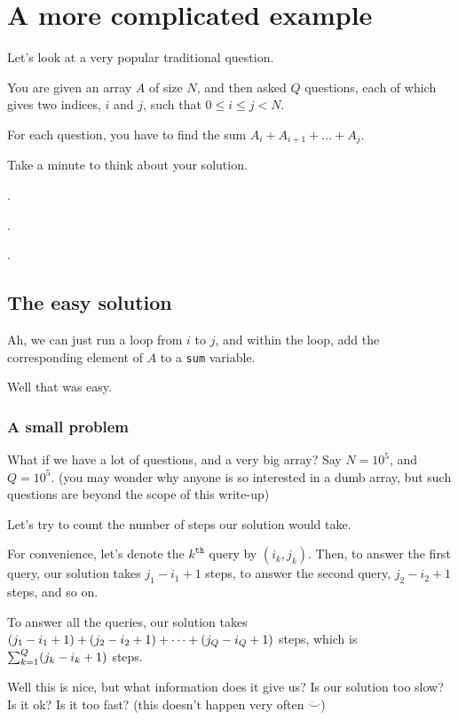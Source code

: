 \documentclass{article}
\DeclarePairedDelimiter{\braces}{(}{)}
\begin{document}
\section{A more complicated example} \label{rsq}

Let's look at a very popular traditional question.

\vspace{1em}

You are given an array $A$ of size $N$,
and then asked $Q$ questions, each of which gives two indices, 
$i$ and $j$, such that $0 \leq i \leq j < N$.

For each question, you have to find the sum
$A_i + A_{i + 1} + \dots + A_j$.

Take a minute to think about your solution.

.

.

.

\subsection{The easy solution} \label{naive-rsq}
Ah, we can just run a loop from $i$ to $j$, and within the loop, add
the corresponding element of $A$ to a \verb|sum| variable.

Well that was easy.

\subsubsection{A small problem}

What if we have a lot of questions, and a very big array?
Say $N = 10^5$, and $Q = 10^5$.
(you may wonder why anyone is so interested in a dumb array, but
such questions are beyond the scope of this write-up)

Let's try to count the number of steps our solution would take.

For convenience, let's denote the $k^{\texttt{th}}$ query by
$(i_k, j_k)$.
Then, to answer the first query, our solution takes
$j_1 - i_1 + 1$ steps, to answer the second query, $j_2 - i_2 + 1$
steps, and so on.

To answer all the queries, our solution takes
$\braces*{j_1 - i_1 + 1} + \braces*{j_2 - i_2 + 1} + \dots + \braces*{j_Q - i_Q + 1}$
steps, which is $\sum_{k = 1}^Q \braces*{j_k - i_k + 1}$ steps.

Well this is nice, but what information does it give us?
Is our solution too slow?
Is it ok?
Is it too fast? (this doesn't happen very often $\ddot\smallsmile$)
\end{document}
